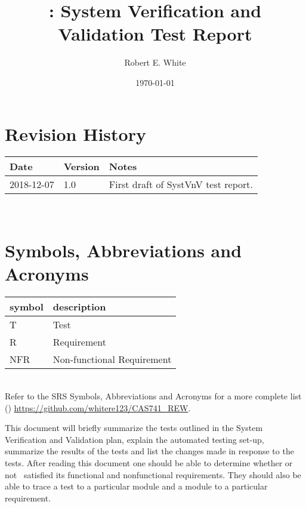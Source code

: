 \documentclass[12pt, titlepage]{article}
\begin{document}
\title{\progname: System Verification and Validation Test Report} 
\author{Robert E. White}
\date{\today}
	
\maketitle


\section{Revision History}

\begin{tabularx}{\textwidth}{p{3cm}p{2cm}X}
\toprule {\bf Date} & {\bf Version} & {\bf Notes}\\
\midrule
2018-12-07 & 1.0 & First draft of SystVnV test report.\\
\bottomrule
\end{tabularx}

~\newpage

\section{Symbols, Abbreviations and Acronyms}

\renewcommand{\arraystretch}{1.2}
\begin{tabular}{l l} 
	\toprule		
	\textbf{symbol} & \textbf{description}\\
	\midrule 
	T & Test\\
	R & Requirement\\ 
	NFR & Non-functional Requirement\\
	\bottomrule
\end{tabular}\\

Refer to the SRS Symbols, Abbreviations and Acronyms for a more 
complete list (\cite{SRS}) \url{https://github.com/whitere123/CAS741_REW}. 

\newpage

\tableofcontents

\listoftables %

\listoffigures %

\newpage


This document will briefly summarize the tests outlined in the System 
Verification and Validation plan, explain the automated testing set-up, 
summarize the results of the tests and list the changes made in response to the 
tests. After reading this document one should be able to determine whether or 
not \progname \ satisfied its functional and nonfunctional requirements. They 
should also be able to trace a test to a particular module and a module to a 
particular requirement. 
\end{document}
